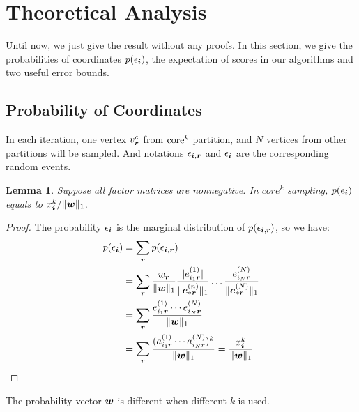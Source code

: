 \documentclass[letterpaper]{article}
\newcommand{\Sca}[3]{{#1}^{(#2)}_{i_#2#3}}%
\newcommand{\anr}[2]{\Sca{a}{#1}{#2}}
\newcommand{\V}[1]{{\boldsymbol{{\MakeLowercase{#1}}}}}
\newcommand{\VnC}[3]{\V{#1}^{(#2)}_{#3}}
\newcommand{\norm}[2]{\|#1\|_{#2}}
\newtheorem{lemma}{Lemma}
\begin{document}
\section{Theoretical Analysis}

Until now, we just give the result without any proofs.
In this section,
we give the probabilities of coordinates $p(\epsilon_{\V{i}})$, 
the expectation of scores in our algorithms and two useful error bounds.

\subsection{Probability of Coordinates}
In each iteration, one vertex $v^c_{\V{r}}$ from ${\rm core}^k$ partition,
and $N$ vertices from other partitions will be sampled.
And notations $\epsilon_{\V{i},\V{r}}$ and $\epsilon_{\V{i}}$ are the corresponding random events.

\begin{lemma}\label{lem:Probability}
    Suppose all factor matrices are nonnegative.
    In $core^k$ sampling, $p(\epsilon_{\V{i}})$ equals to $x^k_{\V{i}}/\norm{\V{w}}{1}$.
\end{lemma}
\begin{proof}
The probability $\epsilon_{\V{i}}$ is the marginal distribution of $p(\epsilon_{\V{i},r})$,
so we have:
\begin{align*}
p(\epsilon_{\V{i}})
& = \sum_{\V{r}} p(\epsilon_{\V{i},\V{r}}) \\
& = \sum_{\V{r}} \frac{w_{\V{r}}}{\norm{\V{W}}{1}}
    \frac{|\Sca{e}{1}{\V{r}}|}{\norm{\VnC{e}{n}{*\V{r}}}{1}}\ldots\frac{|\Sca{e}{N}{\V{r}}|}{\norm{\VnC{e}{N}{*\V{r}}}{1}}\\
& = \sum_{\V{r}} \frac{\Sca{e}{1}{\V{r}}\cdots\Sca{e}{N}{\V{r}}}{\norm{\V{W}}{1}}\\
& = \sum_{r}\frac{(\anr{1}{r}\cdots\anr{N}{r})^k}{\norm{\V{W}}{1}}
  = \frac{x^k_{\V{i}}}{\norm{\V{w}}{1}}
\end{align*}
\end{proof}
The probability vector $\V{w}$ is different when different $k$ is used.
\end{document}
